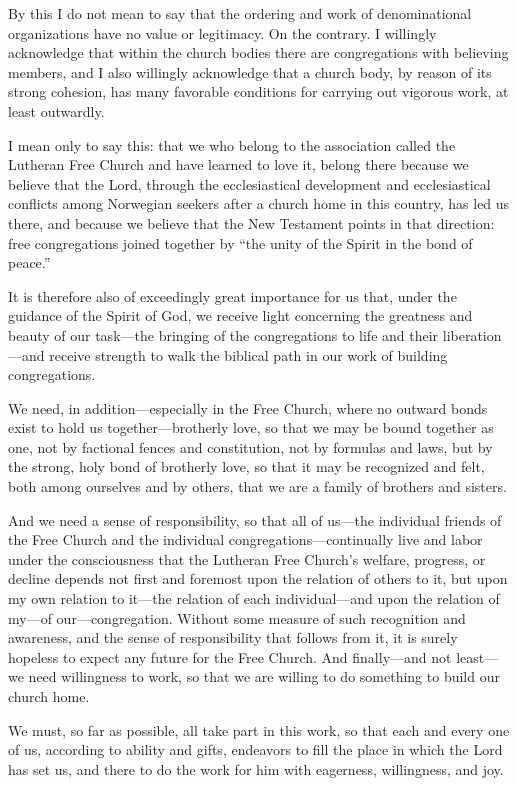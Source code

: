 By this I do not mean to say that the ordering and work of denominational organizations have no value or legitimacy. On the contrary. I willingly acknowledge that within the church bodies there are congregations with believing members, and I also willingly acknowledge that a church body, by reason of its strong cohesion, has many favorable conditions for carrying out vigorous work, at least outwardly.

I mean only to say this: that we who belong to the association called the Lutheran Free Church and have learned to love it, belong there because we believe that the Lord, through the ecclesiastical development and ecclesiastical conflicts among Norwegian seekers after a church home in this country, has led us there, and because we believe that the New Testament points in that direction: free congregations joined together by “the unity of the Spirit in the bond of peace.”

It is therefore also of exceedingly great importance for us that, under the guidance of the Spirit of God, we receive light concerning the greatness and beauty of our task—the bringing of the congregations to life and their liberation—and receive strength to walk the biblical path in our work of building congregations.

We need, in addition—especially in the Free Church, where no outward bonds exist to hold us together—brotherly love, so that we may be bound together as one, not by factional fences and constitution, not by formulas and laws, but by the strong, holy bond of brotherly love, so that it may be recognized and felt, both among ourselves and by others, that we are a family of brothers and sisters.

And we need a sense of responsibility, so that all of us—the individual friends of the Free Church and the individual congregations—continually live and labor under the consciousness that the Lutheran Free Church’s welfare, progress, or decline depends not first and foremost upon the relation of others to it, but upon my own relation to it—the relation of each individual—and upon the relation of my—of our—congregation. Without some measure of such recognition and awareness, and the sense of responsibility that follows from it, it is surely hopeless to expect any future for the Free Church. And finally—and not least—we need willingness to work, so that we are willing to do something to build our church home.

We must, so far as possible, all take part in this work, so that each and every one of us, according to ability and gifts, endeavors to fill the place in which the Lord has set us, and there to do the work for him with eagerness, willingness, and joy.

